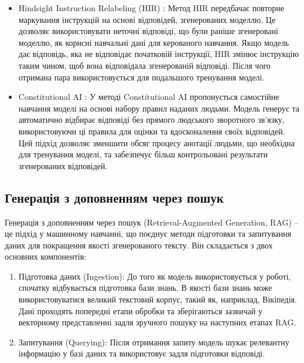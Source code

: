 \begin{itemize}
    \item {Hindsight Instruction Relabeling (HIR)} \cite{zhang2023wisdomhindsightmakeslanguage}: Метод HIR передбачає повторне маркування інструкцій на основі відповідей, згенерованих моделлю. Це дозволяє використовувати неточні відповіді, що були раніше згенеровані моделлю, як корисні навчальні дані для керованого навчання. Якщо модель дає відповідь, яка не відповідає початковій інструкції, HIR змінює інструкцію таким чином, щоб вона відповідала згенерованій відповіді. Після чого отримана пара використовується для подальшого тренування моделі.

    \item {Constitutional AI} \cite{bai2022constitutionalaiharmlessnessai}: У методі Constitutional AI пропонується самостійне навчання моделі на основі набору правил наданих людьми. Модель генерує та автоматично відбирає відповіді без прямого людського зворотного зв'язку, використовуючи ці правила для оцінки та вдосконалення своїх відповідей. Цей підхід дозволяє зменшити обсяг процесу анотації людьми, що необхідна для тренування моделі, та забезпечує більш контрольовані результати згенерованих відповідей.
\end{itemize}

\subsection{Генерація з доповненням через пошук}
Генерація з доповненням через пошук (Retrieval-Augmented Generation, RAG) -- це підхід у машинному навчанні, що поєднує методи підготовки та запитування даних для покращення якості згенерованого тексту. Він складається з двох основних компонентів:
\begin{enumerate}
    \item {Підготовка даних (Ingestion):} До того як модель використовується у роботі, спочатку відбувається підготовка бази знань. В якості бази знань може використовуватися великий текстовий корпус, такий як, наприклад, Вікіпедія. Дані проходять попередні етапи обробки та зберігаються зазвичай у векторному представленні задля зручного пошуку на наступних етапах RAG.
    \item {Запитування (Querying):} Після отримання запиту модель шукає релевантну інформацію у базі даних та використовує задля підготовки відповіді.
\end{enumerate}

